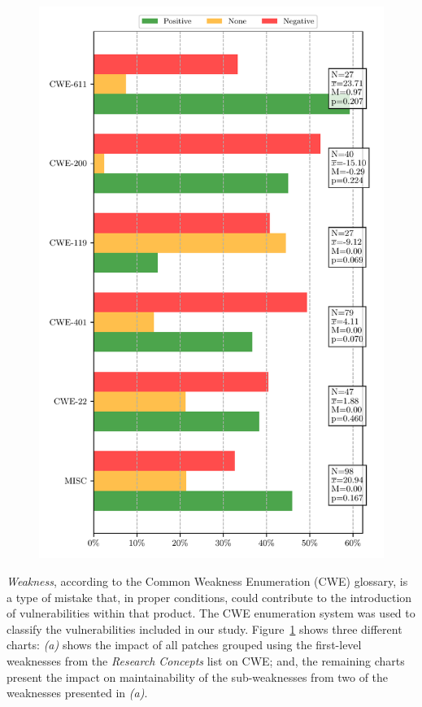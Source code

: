 \documentclass[10pt,conference]{IEEEtran}
\begin{document}
\begin{figure}[htp]
{	\includegraphics[scale=0.4]{figures/main_per_cwe_spec_664.pdf}}
	\label{fig:pat}
\end{figure}

\emph{Weakness}, according to the Common Weakness Enumeration (CWE) glossary, 
is a type of mistake that, in proper conditions, could contribute to the 
introduction of vulnerabilities within that product. The CWE enumeration
system was used to classify the vulnerabilities included in our study.
Figure~\ref{fig:pat} shows three different charts: \emph{(a)} shows
the impact of all patches grouped using the first-level weaknesses from
the \emph{Research Concepts} list on CWE; and, the remaining charts
present the impact on maintainability of the sub-weaknesses from two of
the weaknesses presented in \emph{(a)}. 
\end{document}
